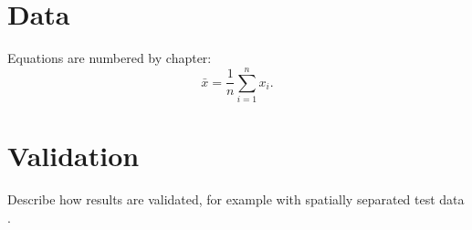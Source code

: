 \section{Data}\label{sec:data}
Equations are numbered by chapter:
\begin{equation}
  \bar{x} = \frac{1}{n}\sum_{i=1}^{n} x_i .
\end{equation}

\section{Validation}\label{sec:validation}
Describe how results are validated, for example with spatially separated test data \citep{roberts2017}.

